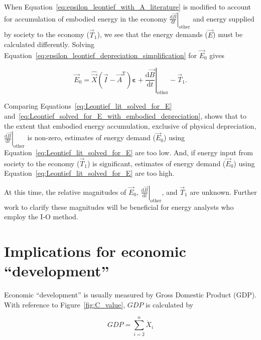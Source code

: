 When Equation~\ref{eq:epsilon_leontief_with_A_literature}
is modified to account for accumulation of embodied energy 
in the economy 
$\left. \frac{\mathrm{d}\vec{B}}{\mathrm{d}t} \right|_{\mathrm{other}}$
and energy supplied by society to the economy ($\vec{T}_{1}$),
we see that the energy demands ($\vec{E}$) must be calculated differently. 
Solving Equation~\ref{eq:epsilon_leontief_depreciation_simplification} 
for $\vec{E}_{0}$ gives 

\begin{equation} \label{eq:Leontief_solved_for_E_with_embodied_depreciation}
	\vec{E}_{0} 
	= \hat{\vec{X}}
		(\vec{I} - \vec{A}^{\mathrm{T}})
		\bm{\varepsilon} 
	+ \left. \frac{\mathrm{d}\vec{B}}{\mathrm{d}t} \right|_{\mathrm{other}}
	- \vec{T}_{1}.
\end{equation}

\noindent{}Comparing Equations~\ref{eq:Leontief_lit_solved_for_E} 
and~\ref{eq:Leontief_solved_for_E_with_embodied_depreciation}, 
shows that to the extent that embodied energy accumulation,
exclusive of physical depreciation,
$\left. \frac{\mathrm{d}\vec{B}}{\mathrm{d}t} \right|_{\mathrm{other}}$
is non-zero, estimates of energy demand ($\vec{E}_{0}$) using 
Equation~\ref{eq:Leontief_lit_solved_for_E} are too low. 
And, if energy input from society to the economy ($\vec{T}_{1}$) is significant,
estimates of energy demand ($\vec{E}_{0}$) using 
Equation~\ref{eq:Leontief_lit_solved_for_E} are too high. 

At this time, the relative magnitudes of $\vec{E}_{0}$,
$\left. \frac{\mathrm{d}\vec{B}}{\mathrm{d}t} \right|_{\mathrm{other}}$,
and $\vec{T}_{1}$ are unknown. 
Further work to clarify these magnitudes will be beneficial
for energy analysts who employ the I-O method.


\section{Implications for economic ``development''}
\label{sec:implications_for_development}

Economic ``development'' is usually measured 
by Gross Domestic Product (GDP).
With reference to Figure~\ref{fig:C_value}, $GDP$ is calculated by

\begin{equation} \label{eq:GDP_def}
	GDP
	= \sum\limits_{i=2}^{n} \dot{X}_{i}
\end{equation}


